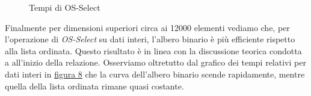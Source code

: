 \documentclass[onecolumn]{article}
\begin{document}
\begin{figure}[H]
	\caption{Tempi di OS-Select}
	\label{fig:os-select-l}
\end{figure}

Finalmente per dimensioni superiori circa ai 12000 elementi vediamo che, per l'operazione di \textit{OS-Select} su dati interi, l'albero binario è più efficiente rispetto alla lista ordinata. Questo risultato è in linea con la discussione teorica condotta a all'inizio della relazione. Osserviamo oltretutto dal grafico dei tempi relativi per dati interi in \hyperref[fig:os-select-l]{figura 8} che la curva dell'albero binario scende rapidamente, mentre quella della lista ordinata rimane quasi costante. 
\end{document}
